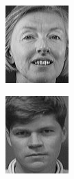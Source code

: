\begin{frame}
\begin{columns}
\begin{overlayarea}{\textwidth}{\textheight}
\begin{minipage}[t]{0.15\textwidth}
        \includegraphics[width=\textwidth]{images/celebrity_images/s32_1.jpg}
      \end{minipage}
      \begin{minipage}[t]{0.15\textwidth}
        \includegraphics[width=\textwidth]{images/celebrity_images/s33_1.jpg}

\end{minipage}
\end{overlayarea}
\end{columns}
\end{frame}
